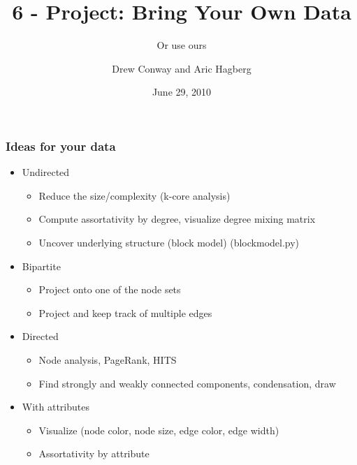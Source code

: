 \documentclass[xcolor=dvipsnames, 9pt]{beamer}
\title{6 - Project: Bring Your Own Data}
\subtitle{Or use ours}
\author{Drew Conway and Aric Hagberg}
\date{June 29, 2010}
\begin{document}
\begin{frame}[plain]
\titlepage
\end{frame}

\begin{frame}
\frametitle{Ideas for your data}
\begin{itemize}
   \item Undirected
   \begin{itemize}
      \item Reduce the size/complexity (k-core analysis)
      \item Compute assortativity by degree, visualize degree mixing matrix
      \item Uncover underlying structure (block model) (blockmodel.py)
   \end{itemize}
   \item Bipartite
   \begin{itemize}
       \item Project onto one of the node sets
       \item Project and keep track of multiple edges 
   \end{itemize}
   \item Directed
   \begin{itemize}
      \item Node analysis, PageRank, HITS
      \item Find strongly and weakly connected components, condensation, draw
   \end{itemize}
   \item With attributes 
   \begin{itemize}
      \item Visualize (node color, node size, edge color, edge width)
      \item Assortativity by attribute
   \end{itemize}
\end{itemize}
\end{frame}
\end{document}
